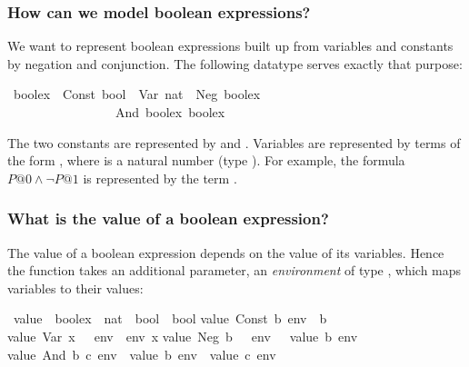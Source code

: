 %
\begin{isabellebody}%
\def\isabellecontext{Ifexpr}%
%
\begin{isamarkuptext}%
\subsubsection{How can we model boolean expressions?}

We want to represent boolean expressions built up from variables and
constants by negation and conjunction. The following datatype serves exactly
that purpose:%
\end{isamarkuptext}%
\ boolex\ {\isacharequal}\ Const\ bool\ {\isacharbar}\ Var\ nat\ {\isacharbar}\ Neg\ boolex\isanewline
\ \ \ \ \ \ \ \ \ \ \ \ \ \ \ \ {\isacharbar}\ And\ boolex\ boolex%
\begin{isamarkuptext}%
\noindent
The two constants are represented by  and
. Variables are represented by terms of the form
, where  is a natural number (type ).
For example, the formula $P@0 \land \neg P@1$ is represented by the term
.

\subsubsection{What is the value of a boolean expression?}

The value of a boolean expression depends on the value of its variables.
Hence the function  takes an additional parameter, an
\emph{environment} of type , which maps variables to their
values:%
\end{isamarkuptext}%
\ value\ {\isacharcolon}{\isacharcolon}\ {\isachardoublequote}boolex\ {\isasymRightarrow}\ {\isacharparenleft}nat\ {\isasymRightarrow}\ bool{\isacharparenright}\ {\isasymRightarrow}\ bool{\isachardoublequote}\isanewline
{}\isanewline
{\isachardoublequote}value\ {\isacharparenleft}Const\ b{\isacharparenright}\ env\ {\isacharequal}\ b{\isachardoublequote}\isanewline
{\isachardoublequote}value\ {\isacharparenleft}Var\ x{\isacharparenright}\ \ \ env\ {\isacharequal}\ env\ x{\isachardoublequote}\isanewline
{\isachardoublequote}value\ {\isacharparenleft}Neg\ b{\isacharparenright}\ \ \ env\ {\isacharequal}\ {\isacharparenleft}{\isasymnot}\ value\ b\ env{\isacharparenright}{\isachardoublequote}\isanewline
{\isachardoublequote}value\ {\isacharparenleft}And\ b\ c{\isacharparenright}\ env\ {\isacharequal}\ {\isacharparenleft}value\ b\ env\ {\isasymand}\ value\ c\ env{\isacharparenright}{\isachardoublequote}%
\begin{isamarkuptext}%
\noindent

\end{isamarkuptext}
\end{isabellebody}
